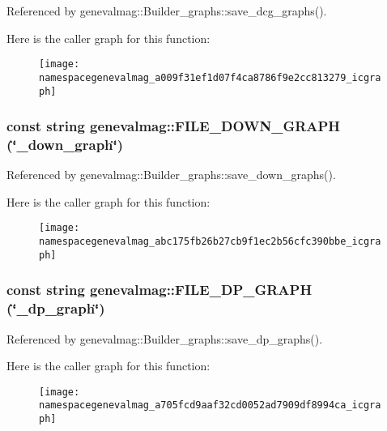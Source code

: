Referenced by genevalmag::Builder\_\-graphs::save\_\-dcg\_\-graphs().



Here is the caller graph for this function:\nopagebreak
\begin{figure}[H]
\begin{center}
\leavevmode
\texttt{[image: namespacegenevalmag\_a009f31ef1d07f4ca8786f9e2cc813279\_icgraph]}
\end{center}
\end{figure}


\hypertarget{namespacegenevalmag_abc175fb26b27cb9f1ec2b56cfc390bbe}{
\subsubsection[{FILE\_\-DOWN\_\-GRAPH}]{\setlength{\rightskip}{0pt plus 5cm}const string genevalmag::FILE\_\-DOWN\_\-GRAPH (\char`\"{}\_\-down\_\-graph\char`\"{})}}
\label{namespacegenevalmag_abc175fb26b27cb9f1ec2b56cfc390bbe}


Referenced by genevalmag::Builder\_\-graphs::save\_\-down\_\-graphs().



Here is the caller graph for this function:\nopagebreak
\begin{figure}[H]
\begin{center}
\leavevmode
\texttt{[image: namespacegenevalmag\_abc175fb26b27cb9f1ec2b56cfc390bbe\_icgraph]}
\end{center}
\end{figure}


\hypertarget{namespacegenevalmag_a705fcd9aaf32cd0052ad7909df8994ca}{
\subsubsection[{FILE\_\-DP\_\-GRAPH}]{\setlength{\rightskip}{0pt plus 5cm}const string genevalmag::FILE\_\-DP\_\-GRAPH (\char`\"{}\_\-dp\_\-graph\char`\"{})}}
\label{namespacegenevalmag_a705fcd9aaf32cd0052ad7909df8994ca}


Referenced by genevalmag::Builder\_\-graphs::save\_\-dp\_\-graphs().



Here is the caller graph for this function:\nopagebreak
\begin{figure}[H]
\begin{center}
\leavevmode
\texttt{[image: namespacegenevalmag\_a705fcd9aaf32cd0052ad7909df8994ca\_icgraph]}
\end{center}
\end{figure}


